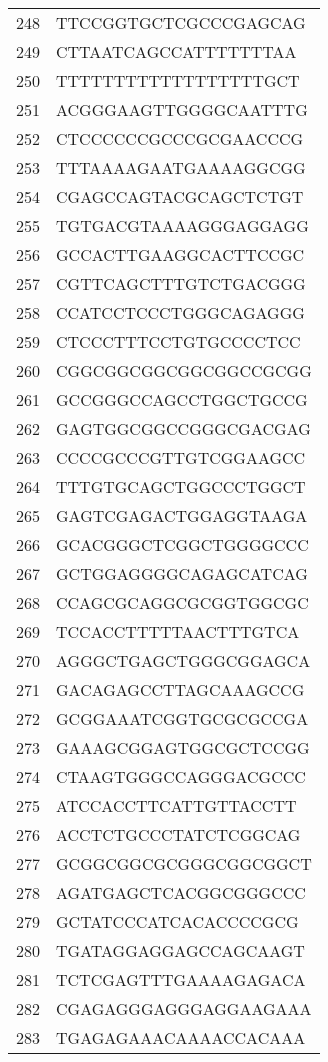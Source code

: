 \documentclass[letterpaper,12pt]{article}
\numberwithin{equation}{appendix}
\begin{document}
{{\begin{table}[ht]
\begin{tabular}{rl}
  248 & TTCCGGTGCTCGCCCGAGCAG \\ 
  249 & CTTAATCAGCCATTTTTTTAA \\ 
  250 & TTTTTTTTTTTTTTTTTTGCT \\ 
  251 & ACGGGAAGTTGGGGCAATTTG \\ 
  252 & CTCCCCCCGCCCGCGAACCCG \\ 
  253 & TTTAAAAGAATGAAAAGGCGG \\ 
  254 & CGAGCCAGTACGCAGCTCTGT \\ 
  255 & TGTGACGTAAAAGGGAGGAGG \\ 
  256 & GCCACTTGAAGGCACTTCCGC \\ 
  257 & CGTTCAGCTTTGTCTGACGGG \\ 
  258 & CCATCCTCCCTGGGCAGAGGG \\ 
  259 & CTCCCTTTCCTGTGCCCCTCC \\ 
  260 & CGGCGGCGGCGGCGGCCGCGG \\ 
  261 & GCCGGGCCAGCCTGGCTGCCG \\ 
  262 & GAGTGGCGGCCGGGCGACGAG \\ 
  263 & CCCCGCCCGTTGTCGGAAGCC \\ 
  264 & TTTGTGCAGCTGGCCCTGGCT \\ 
  265 & GAGTCGAGACTGGAGGTAAGA \\ 
  266 & GCACGGGCTCGGCTGGGGCCC \\ 
  267 & GCTGGAGGGGCAGAGCATCAG \\ 
  268 & CCAGCGCAGGCGCGGTGGCGC \\ 
  269 & TCCACCTTTTTAACTTTGTCA \\ 
  270 & AGGGCTGAGCTGGGCGGAGCA \\ 
  271 & GACAGAGCCTTAGCAAAGCCG \\ 
  272 & GCGGAAATCGGTGCGCGCCGA \\ 
  273 & GAAAGCGGAGTGGCGCTCCGG \\ 
  274 & CTAAGTGGGCCAGGGACGCCC \\ 
  275 & ATCCACCTTCATTGTTACCTT \\ 
  276 & ACCTCTGCCCTATCTCGGCAG \\ 
  277 & GCGGCGGCGCGGGCGGCGGCT \\ 
  278 & AGATGAGCTCACGGCGGGCCC \\ 
  279 & GCTATCCCATCACACCCCGCG \\ 
  280 & TGATAGGAGGAGCCAGCAAGT \\ 
  281 & TCTCGAGTTTGAAAAGAGACA \\ 
  282 & CGAGAGGGAGGGAGGAAGAAA \\ 
  283 & TGAGAGAAACAAAACCACAAA \\ 

\end{tabular}
\end{table}}}
\end{document}
